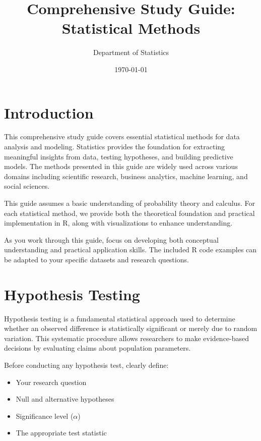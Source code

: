 \documentclass[11pt,a4paper]{article}
\title{\color{maincolor}\LARGE \textbf{Comprehensive Study Guide: Statistical Methods}}
\author{Department of Statistics}
\date{\today}
\begin{document}
\maketitle
\thispagestyle{empty}

\tableofcontents
\newpage

\section*{Introduction}

This comprehensive study guide covers essential statistical methods for data analysis and modeling. Statistics provides the foundation for extracting meaningful insights from data, testing hypotheses, and building predictive models. The methods presented in this guide are widely used across various domains including scientific research, business analytics, machine learning, and social sciences.

\begin{notebox}
This guide assumes a basic understanding of probability theory and calculus. For each statistical method, we provide both the theoretical foundation and practical implementation in R, along with visualizations to enhance understanding.
\end{notebox}

As you work through this guide, focus on developing both conceptual understanding and practical application skills. The included R code examples can be adapted to your specific datasets and research questions.

\section{Hypothesis Testing}

Hypothesis testing is a fundamental statistical approach used to determine whether an observed difference is statistically significant or merely due to random variation. This systematic procedure allows researchers to make evidence-based decisions by evaluating claims about population parameters.

\begin{tipbox}
Before conducting any hypothesis test, clearly define:
\begin{itemize}
  \item Your research question
  \item Null and alternative hypotheses
  \item Significance level ($\alpha$)
  \item The appropriate test statistic
\end{itemize}
\end{tipbox}
\end{document}

